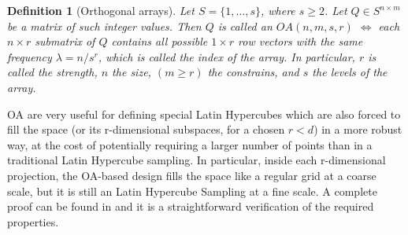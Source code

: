\documentclass{article}
\newtheorem{definition}[theorem]{Definition}
\newtheorem{proposition}[theorem]{Proposition}
\begin{document}
\begin{definition}[Orthogonal arrays]
Let $S=\{1,\dots,s\}$, where $s\ge 2$. Let $Q\in S^{n\times m}$ be a matrix of such integer values. Then $Q$ is called an $OA(n,m,s,r)$ $\Longleftrightarrow$ each $n\times r$ submatrix of $Q$ contains all possible $1\times r$ row vectors with the same frequency $\lambda=n/s^r$, which is called the index of the array. In particular, $r$ is called the strength, $n$ the size, $(m\ge r)$ the constrains, and $s$ the levels of the array.
\end{definition}

OA are very useful for defining special Latin Hypercubes which are also forced to fill the space (or its r-dimensional subspaces, for a chosen $r<d$) in a more robust way, at the cost of potentially requiring a larger number of points than in a traditional Latin Hypercube sampling. In particular, inside each r-dimensional projection, the OA-based design fills the space like a regular grid at a coarse scale, but it is still an Latin Hypercube Sampling at a fine scale. A complete proof can be found in \citep{Tang1993} and it is a straightforward verification of the required properties.


\end{document}

